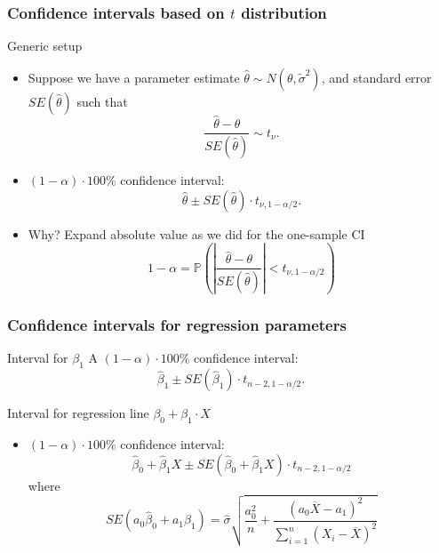 \documentclass[handout]{beamer}
\newcommand{\Pp}{\mathbb{P}}
\begin{document}
   \begin{frame} \frametitle{Confidence intervals based on $t$ distribution}

   \begin{block}
   {Generic setup}
   \begin{itemize}[<+->]
   \item Suppose we have a parameter estimate $\widehat{\theta} \sim N(\theta, \widetilde{\sigma}^2)$, and standard error $SE(\widehat{\theta})$ such that
   $$
   \frac{\widehat{\theta}-\theta}{SE(\widehat{\theta})} \sim t_{\nu}.$$

   \item $(1-\alpha) \cdot 100 \%$ confidence interval:
   $$
   \widehat{\theta} \pm SE(\widehat{\theta}) \cdot t_{\nu, 1-\alpha/2}.$$

   \item Why? Expand absolute value as we did for the one-sample CI
   $$
   1 - \alpha = \Pp\left(\left|\frac{\widehat{\theta} - \theta}{SE(\widehat{\theta})} \right| < t_{\nu, 1-\alpha/2}\right)
   $$
   \end{itemize}
   \end{block}
   \end{frame}


   \begin{frame} \frametitle{Confidence intervals for regression parameters}

   \begin{block}
   {Interval for $\beta_1$}
   A $(1-\alpha) \cdot 100 \%$ confidence interval:
   $$
   \widehat{\beta}_1 \pm SE(\widehat{\beta}_1) \cdot t_{n-2, 1-\alpha/2}.$$


   \end{block}

   \begin{block}
   {Interval for regression line $\beta_0 + \beta_1 \cdot X$}
   \begin{itemize}[<+->]

   \item $(1-\alpha) \cdot 100 \%$ confidence interval:
   $$
   \widehat{\beta}_0 + \widehat{\beta}_1 X \pm SE(\widehat{\beta}_0 + \widehat{\beta}_1 X) \cdot t_{n-2, 1-\alpha/2}$$
   where $$
   SE(a_0\widehat{\beta}_0 + a_1\widehat{\beta}_1) = \widehat{\sigma} \sqrt{\frac{a_0^2}{n} + \frac{(a_0\overline{X} - a_1)^2}{\sum_{i=1}^n \left(X_i-\overline{X}\right)^2}}$$
   \end{itemize}

   \end{block}
   \end{frame}
\end{document}

